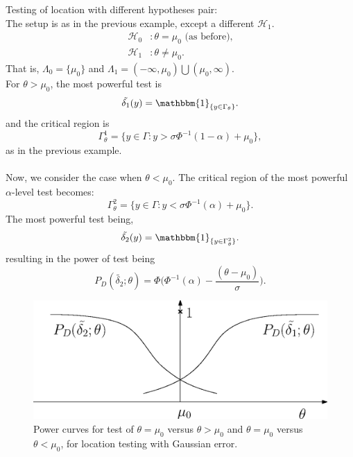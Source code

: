 \documentclass[a4paper,english,12pt]{article}
\begin{document}
\begin{exmp}{Testing of location with different hypotheses pair:}\\
The setup is as in the previous example, except a different $\mathcal{H}_1$.
\begin{align*}
\mathcal{H}_0 &: \theta = \mu_0  \text{   (as before),}\\
\mathcal{H}_1 &: \theta \neq \mu_0.
\end{align*}
That is, $\Lambda_0 = \{\mu_0\}$ and $\Lambda_1 = (-\infty, \mu_0) \bigcup (\mu_0, \infty)$.\\
For $\theta > \mu_0$, the most powerful test is
\begin{equation}
\tilde{\delta_1}(y) = \mathbbm{1}_{\{y \in \Gamma_\theta\}}.
\end{equation}
and the critical region is
\begin{equation}
\Gamma_\theta^1 = \{y \in \Gamma: y > \sigma\Phi^{-1}(1 - \alpha) + \mu_0\},
\end{equation}
as in the previous example.\\\\
Now, we consider the case when $\theta < \mu_0$. The critical region of the most powerful $\alpha$-level test becomes:
\begin{equation}
\Gamma_\theta^2 = \{y \in \Gamma: y < \sigma\Phi^{-1}(\alpha) + \mu_0\}.
\end{equation}
The most powerful test being,
\begin{equation}
\tilde{\delta_2}(y) = \mathbbm{1}_{\{y \in \Gamma_\theta^2\}}.
\end{equation}
resulting in the power of test being
\begin{equation}
P_D(\tilde{\delta_2}; \theta) = \Phi\Big(\Phi^{-1}(\alpha) - \dfrac{(\theta - \mu_0)}{\sigma}\Big).
\end{equation}
\begin{figure}
\centering
\includegraphics[scale=0.6]{Figures/PD.eps}
\caption{Power curves for test of $\theta = \mu_0$ versus $\theta > \mu_0$ and $\theta = \mu_0$ versus $\theta < \mu_0$, for location testing with Gaussian error.}
\label{fig: example 1.5 and 1.6}
\end{figure}
\end{exmp}
\end{document}
